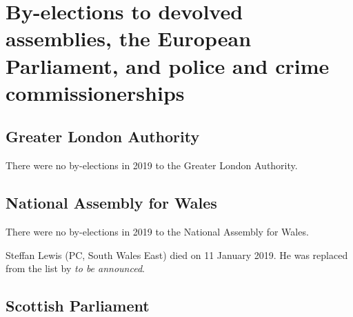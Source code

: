 \documentclass[a4paper,openany]{book}
\begin{document}

\chapter{By-elections to devolved assemblies, the European Parliament, and police and crime commissionerships}

\section{Greater London Authority}

There were no by-elections in 2019 to the Greater London Authority.


\section{National Assembly for Wales}

There were no by-elections in 2019 to the National Assembly for Wales.

Steffan Lewis (PC, South Wales East) died on 11 January 2019.  He was replaced from the list by \emph{to be announced}.

\section{Scottish Parliament}
\end{document}
